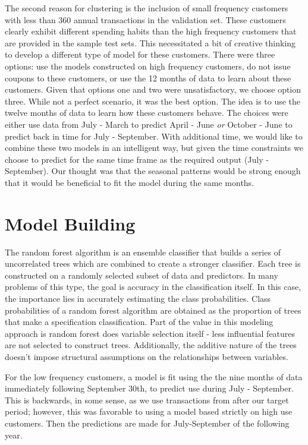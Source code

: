 \documentclass[12pt]{article} %
\begin{document}
The second reason for clustering is the inclusion of small frequency customers with less than 360 annual transactions in the validation set.  These customers clearly exhibit different spending habits than the high frequency customers that are provided in the sample test sets.  This necessitated a bit of creative thinking to develop a different type of model for these customers.  There were three options: use the models constructed on high frequency customers, do not issue coupons to these customers, or use the 12 months of data to learn about these customers.  Given that options one and two were unsatisfactory, we choose option three.  While not a perfect scenario, it was the best option.   The idea is to use the twelve months of data to learn how these customers behave.  The choices were either use data from July - March to predict April - June \emph{or}  October - June to predict back in time for July - September.  With additional time, we would like to combine these two models in an intelligent way, but given the time constraints we choose to predict for the same time frame as the required output (July - September).  Our thought was that the seasonal patterns would be strong enough that it would be beneficial to fit the model during the same months.

\section{Model Building}
The random forest algorithm is an ensemble classifier that builds a series of uncorrelated trees which are combined to create a stronger classifier.  Each tree is constructed on a randomly selected subset of data and predictors.  In many problems of this type, the goal is accuracy in the classification itself.  In this case, the importance lies in accurately estimating the class probabilities.  Class probabilities of a random forest algorithm are obtained as the proportion of trees that make a specification classification.  Part of the value in this modeling approach is random forest does variable selection itself - less influential features are not selected to construct trees.  Additionally, the additive nature of the trees doesn't impose structural assumptions on the relationships between variables.

For the low frequency customers, a model is fit using the the nine months of data immediately following September 30th, to predict use during July - September.  This is backwards, in some sense, as we use transactions from after our target period; however, this was favorable to using a model based strictly on high use customers.  Then the predictions are made for July-September of the following year.
\end{document}

